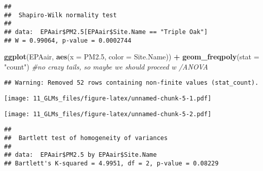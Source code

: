 \documentclass[]{article}
\newenvironment{Shaded}{\begin{snugshade}}{\end{snugshade}}
\newcommand{\KeywordTok}[1]{\textcolor[rgb]{0.13,0.29,0.53}{\textbf{#1}}}
\newcommand{\DataTypeTok}[1]{\textcolor[rgb]{0.13,0.29,0.53}{#1}}
\newcommand{\DecValTok}[1]{\textcolor[rgb]{0.00,0.00,0.81}{#1}}
\newcommand{\StringTok}[1]{\textcolor[rgb]{0.31,0.60,0.02}{#1}}
\newcommand{\CommentTok}[1]{\textcolor[rgb]{0.56,0.35,0.01}{\textit{#1}}}
\newcommand{\OperatorTok}[1]{\textcolor[rgb]{0.81,0.36,0.00}{\textbf{#1}}}
\newcommand{\NormalTok}[1]{#1}
\begin{document}
\begin{verbatim}
## 
##  Shapiro-Wilk normality test
## 
## data:  EPAair$PM2.5[EPAair$Site.Name == "Triple Oak"]
## W = 0.99064, p-value = 0.0002744
\end{verbatim}

\begin{Shaded}
\begin{Highlighting}[]
\KeywordTok{ggplot}\NormalTok{(EPAair, }\KeywordTok{aes}\NormalTok{(}\DataTypeTok{x =}\NormalTok{ PM2.}\DecValTok{5}\NormalTok{, }\DataTypeTok{color =}\NormalTok{ Site.Name)) }\OperatorTok{+}
\StringTok{  }\KeywordTok{geom_freqpoly}\NormalTok{(}\DataTypeTok{stat =} \StringTok{"count"}\NormalTok{) }\CommentTok{#no crazy tails, so maybe we should proceed w /ANOVA}
\end{Highlighting}
\end{Shaded}

\begin{verbatim}
## Warning: Removed 52 rows containing non-finite values (stat_count).
\end{verbatim}

\texttt{[image: 11\_GLMs\_files/figure-latex/unnamed-chunk-5-1.pdf]}

\begin{Shaded}
\end{Shaded}

\texttt{[image: 11\_GLMs\_files/figure-latex/unnamed-chunk-5-2.pdf]}

\begin{Shaded}
\end{Shaded}

\begin{verbatim}
## 
##  Bartlett test of homogeneity of variances
## 
## data:  EPAair$PM2.5 by EPAair$Site.Name
## Bartlett's K-squared = 4.9951, df = 2, p-value = 0.08229
\end{verbatim}
\end{document}
